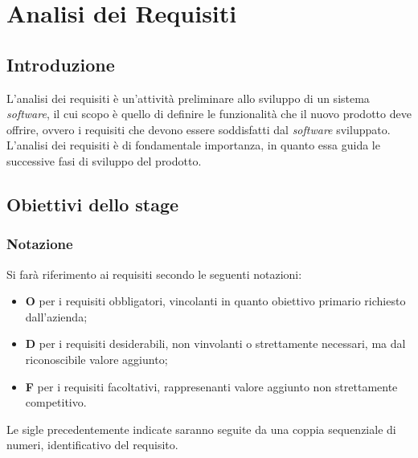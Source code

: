 \chapter{Analisi dei Requisiti}
\label{Analisi dei Requisiti}

\section{Introduzione}
L'analisi dei requisiti è un'attività preliminare allo sviluppo di un sistema \textit{software}, il cui scopo è quello di definire le funzionalità che il nuovo prodotto deve offrire, ovvero i requisiti che devono essere soddisfatti dal \textit{software} sviluppato. 
L'analisi dei requisiti è di fondamentale importanza, in quanto essa guida le successive fasi di sviluppo del prodotto.

\section{Obiettivi dello stage}

\subsection*{Notazione}
Si farà riferimento ai requisiti secondo le seguenti notazioni:
\begin{itemize}
    \item \textbf{O} per i requisiti obbligatori, vincolanti in quanto obiettivo primario richiesto dall'azienda;
    \item \textbf{D} per i requisiti desiderabili, non vinvolanti o strettamente necessari, ma dal riconoscibile valore aggiunto;
    \item \textbf{F} per i requisiti facoltativi, rappresenanti valore aggiunto non strettamente competitivo.
\end{itemize}
Le sigle precedentemente indicate saranno seguite da una coppia sequenziale di numeri, identificativo del requisito.

\newpage
